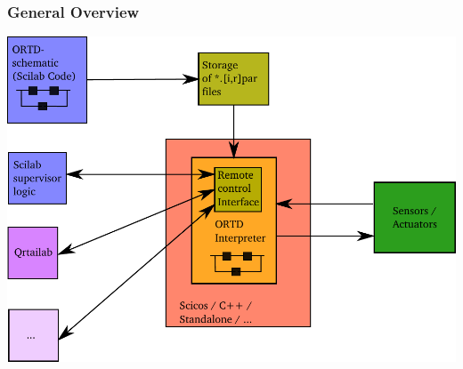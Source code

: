 \documentclass[serif,9pt,xcolor=dvipsnames]{beamer}
\begin{document}
\begin{frame}

 \frametitle{General Overview}



\includegraphics[trim=0mm 0mm 0mm 0mm, clip,width=0.95\linewidth]{../pictures/ortd_principle.pdf}

\end{frame}



% 
% 
% 
\end{document}
